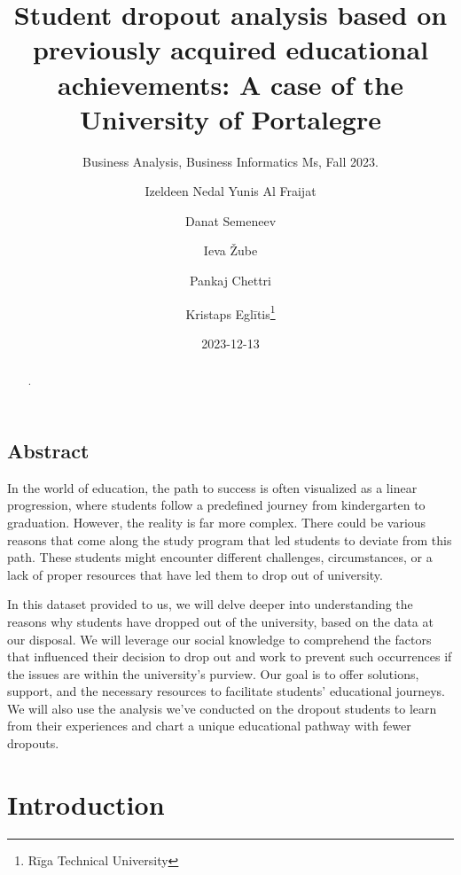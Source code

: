 \documentclass[
  letterpaper,
  DIV=11,
  numbers=noendperiod]{scrartcl}
\title{Student dropout analysis based on previously acquired educational
achievements: A case of the University of Portalegre}
\subtitle{Business Analysis, Business Informatics Ms, Fall 2023.}
\author{Izeldeen Nedal Yunis Al Fraijat \and Danat Semeneev \and Ieva
Žube \and Pankaj Chettri \and Kristaps Eglītis\footnote{Rīga Technical
  University}}
\date{2023-12-13}
\begin{document}
\maketitle
\begin{abstract}
.
\end{abstract}
\ifdefined\Shaded\renewenvironment{Shaded}{\begin{tcolorbox}[boxrule=0pt, interior hidden, breakable, borderline west={3pt}{0pt}{shadecolor}, enhanced, frame hidden, sharp corners]}{\end{tcolorbox}}\fi

\hypertarget{abstract}{%
\subsection{Abstract}\label{abstract}}

In the world of education, the path to success is often visualized as a
linear progression, where students follow a predefined journey from
kindergarten to graduation. However, the reality is far more complex.
There could be various reasons that come along the study program that
led students to deviate from this path. These students might encounter
different challenges, circumstances, or a lack of proper resources that
have led them to drop out of university.

In this dataset provided to us, we will delve deeper into understanding
the reasons why students have dropped out of the university, based on
the data at our disposal. We will leverage our social knowledge to
comprehend the factors that influenced their decision to drop out and
work to prevent such occurrences if the issues are within the
university's purview. Our goal is to offer solutions, support, and the
necessary resources to facilitate students' educational journeys. We
will also use the analysis we've conducted on the dropout students to
learn from their experiences and chart a unique educational pathway with
fewer dropouts.

\hypertarget{introduction}{%
\section{Introduction}\label{introduction}}
\end{document}
